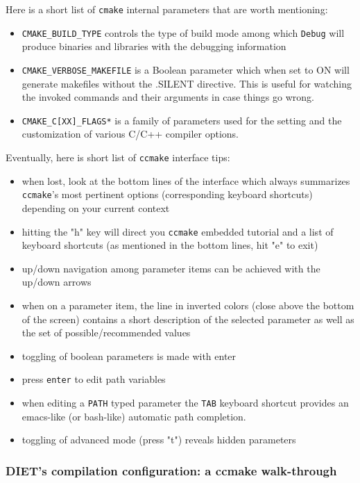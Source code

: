Here is a short list of \verb+cmake+ internal parameters that are worth
mentioning:
\begin{itemize}
\item
  \verb+CMAKE_BUILD_TYPE+ controls the type of build mode among which 
  \verb+Debug+ will produce binaries and libraries with the debugging
   information
\item
   \verb+CMAKE_VERBOSE_MAKEFILE+ is a Boolean parameter which when set to
   ON will generate makefiles without the .SILENT directive. This is
   useful for watching the invoked commands and their arguments in case
   things go wrong.
\item
   \verb+CMAKE_C[XX]_FLAGS*+ is a family of parameters used for
   the setting and the customization of various C/C++ compiler options.
\end{itemize}
%
Eventually, here is short list of \verb+ccmake+ interface tips:
\begin{itemize}
\item
  when lost, look at the bottom lines of the interface which always
  summarizes \verb+ccmake+'s most pertinent options (corresponding
  keyboard shortcuts) depending on your current context
\item
  hitting the "h" key will direct you \verb+ccmake+ embedded tutorial
  and a list of keyboard shortcuts (as mentioned in the bottom
  lines, hit "e" to exit)
\item
  up/down navigation among parameter items can be achieved with the
  up/down arrows
\item
  when on a parameter item, the line in inverted colors (close above the
  bottom of the screen) contains a short description of the selected
  parameter as well as the set of possible/recommended values
\item
  toggling of boolean parameters is made with enter
\item
  press \verb+enter+ to edit path variables
\item
  when editing a \verb+PATH+ typed parameter the \verb+TAB+ keyboard
  shortcut provides an emacs-like (or bash-like) automatic path completion.
\item
  toggling of advanced mode (press "t") reveals hidden parameters
\end{itemize}
 
\subsubsection{DIET's compilation configuration: a ccmake walk-through}

